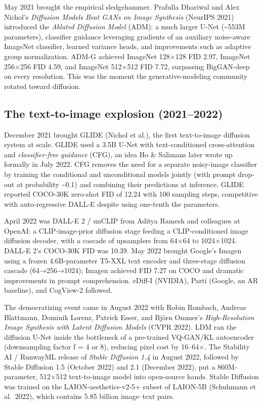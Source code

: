 \documentclass{article}
\begin{document}
May 2021 brought the empirical sledgehammer. Prafulla Dhariwal and Alex Nichol's \emph{Diffusion Models Beat GANs on Image Synthesis} (NeurIPS 2021) introduced the \emph{Ablated Diffusion Model} (ADM): a much larger U-Net (\textasciitilde553M parameters), classifier guidance leveraging gradients of an auxiliary noise-aware ImageNet classifier, learned variance heads, and improvements such as adaptive group normalization. ADM-G achieved ImageNet 128×128 FID 2.97, ImageNet 256×256 FID 4.59, and ImageNet 512×512 FID 7.72, surpassing BigGAN-deep on every resolution. This was the moment the generative-modeling community rotated toward diffusion.

\subsection{The text-to-image explosion (2021--2022)}\label{the-text-to-image-explosion-20212022}

December 2021 brought GLIDE (Nichol et al.), the first text-to-image diffusion system at scale. GLIDE used a 3.5B U-Net with text-conditioned cross-attention and \emph{classifier-free guidance} (CFG), an idea Ho \& Salimans later wrote up formally in July 2022. CFG removes the need for a separate noisy-image classifier by training the conditional and unconditional models jointly (with prompt drop-out at probability \textasciitilde0.1) and combining their predictions at inference. GLIDE reported COCO-30K zero-shot FID of 12.24 with 100 sampling steps, competitive with auto-regressive DALL-E despite using one-tenth the parameters.

April 2022 was DALL-E 2 / unCLIP from Aditya Ramesh and colleagues at OpenAI: a CLIP-image-prior diffusion stage feeding a CLIP-conditioned image diffusion decoder, with a cascade of upsamplers from 64×64 to 1024×1024. DALL-E 2's COCO-30K FID was 10.39. May 2022 brought Google's Imagen \citep{saharia20222022} using a frozen 4.6B-parameter T5-XXL text encoder and three-stage diffusion cascade (64→256→1024); Imagen achieved FID 7.27 on COCO and dramatic improvements in prompt comprehension. eDiff-I (NVIDIA), Parti (Google, an AR baseline), and CogView-2 followed.

The democratizing event came in August 2022 with Robin Rombach, Andreas Blattmann, Dominik Lorenz, Patrick Esser, and Björn Ommer's \emph{High-Resolution Image Synthesis with Latent Diffusion Models} (CVPR 2022). LDM ran the diffusion U-Net inside the bottleneck of a pre-trained VQ-GAN/KL autoencoder (downsampling factor f = 4 or 8), reducing pixel cost by 16--64×. The Stability AI / RunwayML release of \emph{Stable Diffusion 1.4} in August 2022, followed by Stable Diffusion 1.5 (October 2022) and 2.1 (December 2022), put a 860M-parameter, 512×512 text-to-image model into open-source hands. Stable Diffusion was trained on the LAION-aesthetics-v2-5+ subset of LAION-5B (Schuhmann et al.~2022), which contains 5.85 billion image--text pairs.
\end{document}

